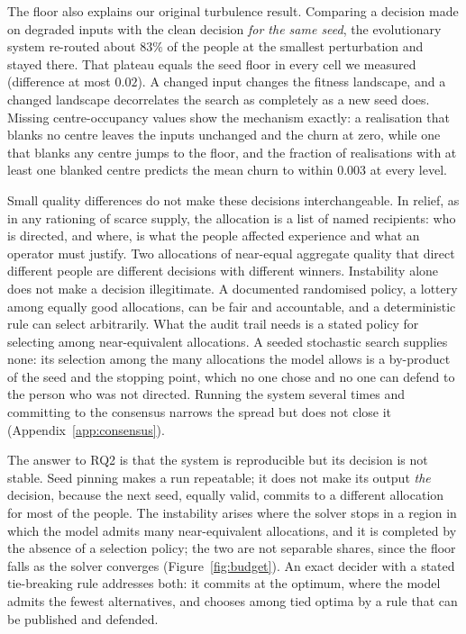\documentclass[systems,article,submit,moreauthors,pdftex]{Definitions/mdpi}
\begin{document}
The floor also explains our original turbulence result. Comparing a decision made on
degraded inputs with the clean decision \emph{for the same seed}, the evolutionary system
re-routed about $83\%$ of the people at the smallest perturbation and stayed there. That
plateau equals the seed floor in every cell we measured (difference at most $0.02$). A changed
input changes the fitness landscape, and a changed landscape decorrelates the search as
completely as a new seed does. Missing centre-occupancy values show the mechanism exactly:
a realisation that blanks no centre leaves the inputs unchanged and the churn at zero, while
one that blanks any centre jumps to the floor, and the fraction of realisations with at
least one blanked centre predicts the mean churn to within $0.003$ at every level.

Small quality differences do not make these decisions interchangeable. In relief, as in any
rationing of scarce supply, the allocation is a list of named recipients: who is directed,
and where, is what the people affected experience and what an operator must justify. Two
allocations of near-equal aggregate quality that direct different people are different
decisions with different winners. Instability alone does not make a decision illegitimate. A
documented randomised policy, a lottery among equally good allocations, can be fair and
accountable, and a deterministic rule can select arbitrarily. What the audit trail needs is a
stated policy for selecting among near-equivalent allocations. A seeded stochastic search
supplies none: its selection among the many allocations the model allows is a by-product of
the seed and the stopping point, which no one chose and no one can defend to the person who was
not directed. Running the system several times and committing to the consensus narrows the
spread but does not close it (Appendix~\ref{app:consensus}).

The answer to RQ2 is that the system is reproducible but its decision is not stable. Seed
pinning makes a run repeatable; it does not make its output \emph{the} decision, because the
next seed, equally valid, commits to a different allocation for most of the people. The
instability arises where the solver stops in a region in which the model admits many
near-equivalent allocations, and it is completed by the absence of a selection policy; the two
are not separable shares, since the floor falls as the solver converges (Figure~\ref{fig:budget}). An exact decider with a stated
tie-breaking rule addresses both: it commits at the optimum, where the model admits the fewest
alternatives, and chooses among tied optima by a rule that can be published and defended.
\end{document}
